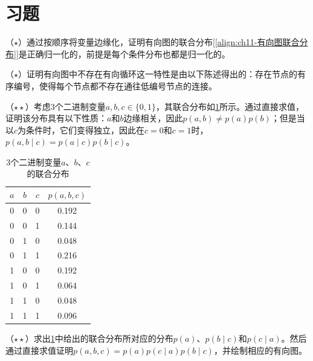 \documentclass[../../main.tex]{subfiles}
\begin{document}
\section{习题}\label{section:ch11-习题}

\begin{exercise}\label{exercise:ch11-01}
（$\star$）通过按顺序将变量边缘化，证明有向图的联合分布[\eqref{align:ch11-有向图联合分布}]是正确归一化的，前提是每个条件分布也都是归一化的。
\end{exercise}

\begin{exercise}\label{exercise:ch11-02}
（$\star$）证明有向图中不存在有向循环这一特性是由以下陈述得出的：存在节点的有序编号，使得每个节点都不存在通往低编号节点的连接。
\end{exercise}

\begin{exercise}\label{exercise:ch11-03}
（$\star\star$）考虑3个二进制变量$a,b,c\in\{0,1\}$，其联合分布如\cref{table:ch11-三变量联合分布}所示。通过直接求值，证明该分布具有以下性质：$a$和$b$边缘相关，因此$p(a,b)\neq p(a)p(b)$；但是当以$c$为条件时，它们变得独立，因此在$c=0$和$c=1$时，$p(a,b\mid c)=p(a\mid c)p(b\mid c)$。
\end{exercise}

\begin{table}[htbp]
  \centering
  \caption{3个二进制变量$a$、$b$、$c$的联合分布}
  \label{table:ch11-三变量联合分布}
  \begin{tabular}{ccc|c}
    \toprule
    $a$ & $b$ & $c$ & $p(a,b,c)$\\
    \midrule
    0 & 0 & 0 & 0.192\\
    0 & 0 & 1 & 0.144\\
    0 & 1 & 0 & 0.048\\
    0 & 1 & 1 & 0.216\\
    1 & 0 & 0 & 0.192\\
    1 & 0 & 1 & 0.064\\
    1 & 1 & 0 & 0.048\\
    1 & 1 & 1 & 0.096\\
    \bottomrule
  \end{tabular}
\end{table}

\begin{exercise}\label{exercise:ch11-04}
（$\star\star$）求出\cref{table:ch11-三变量联合分布}中给出的联合分布所对应的分布$p(a)$、$p(b\mid c)$和$p(c\mid a)$。然后通过直接求值证明$p(a,b,c)=p(a)p(c\mid a)p(b\mid c)$，并绘制相应的有向图。
\end{exercise}
\end{document}
